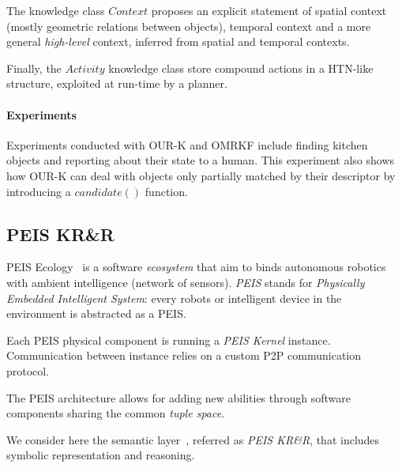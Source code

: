 The knowledge class $Context$ proposes an explicit statement of spatial context
(mostly geometric relations between objects), temporal context and a more
general \emph{high-level} context, inferred from spatial and temporal contexts.

Finally, the $Activity$ knowledge class store compound actions in a HTN-like
structure, exploited at run-time by a planner.


\paragraph{Experiments} Experiments conducted with OUR-K and OMRKF include
finding kitchen objects and reporting about their state to a human.  This
experiment also shows how OUR-K can deal with objects only partially matched by
their descriptor by introducing a $candidate()$ function.

\subsection{PEIS KR\&R}
\label{sect|peis-ecology}

{\sc PEIS Ecology}~\cite{Saffiotti2005} is a software \emph{ecosystem} that aim
to binds autonomous robotics with ambient intelligence (network of sensors).
\emph{PEIS} stands for \emph{Physically Embedded Intelligent System}: every
robots or intelligent device in the environment is abstracted as a PEIS.

Each PEIS physical component is running a \emph{PEIS Kernel} instance.
Communication between instance relies on a custom P2P communication protocol.

The PEIS architecture allows for adding new abilities through software
components sharing the common \emph{tuple space}.

We consider here the semantic layer~\cite{Daoutis2009}, referred as \emph{PEIS
KR\&R}, that includes symbolic representation and reasoning.



